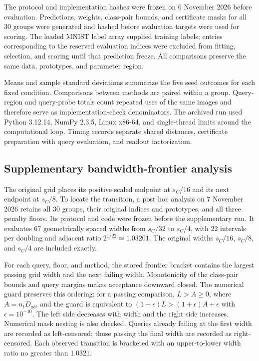 \documentclass[preprint,12pt,authoryear]{elsarticle}
\begin{document}
The protocol and implementation hashes were frozen on 6 November 2026 before evaluation. Predictions, weights, class-pair bounds, and certificate masks for all 30 groups were generated and hashed before evaluation targets were used for scoring. The loaded MNIST label array supplied training labels; entries corresponding to the reserved evaluation indices were excluded from fitting, selection, and scoring until that prediction freeze. All comparisons preserve the same data, prototypes, and parameter region.

Means and sample standard deviations summarize the five seed outcomes for each fixed condition. Comparisons between methods are paired within a group. Query-region and query-probe totals count repeated uses of the same images and therefore serve as implementation-check denominators. The archived run used Python 3.12.14, NumPy 2.3.5, Linux x86-64, and single-thread limits around the computational loop. Timing records separate shared distances, certificate preparation with query evaluation, and readout factorization.

\subsection{Supplementary bandwidth-frontier analysis}
The original grid places its positive scaled endpoint at $s_C/16$ and its next endpoint at $s_C/8$. To locate the transition, a post hoc analysis on 7 November 2026 retains all 30 groups, their original indices and prototypes, and all three penalty floors. Its protocol and code were frozen before the supplementary run. It evaluates 67 geometrically spaced widths from $s_C/32$ to $s_C/4$, with 22 intervals per doubling and adjacent ratio $2^{1/22}\simeq1.03201$. The original widths $s_C/16$, $s_C/8$, and $s_C/4$ are included exactly.

For each query, floor, and method, the stored frontier bracket contains the largest passing grid width and the next failing width. Monotonicity of the class-pair bounds and query margins makes acceptance downward closed. The numerical guard preserves this ordering: for a passing comparison, $L>A\geq0$, where $A=n_tD_{ab}$, and the guard is equivalent to $(1-\epsilon)L>(1+\epsilon)A+\epsilon$ with $\epsilon=10^{-10}$. The left side decreases with width and the right side increases. Numerical mask nesting is also checked. Queries already failing at the first width are recorded as left-censored; those passing the final width are recorded as right-censored. Each observed transition is bracketed with an upper-to-lower width ratio no greater than 1.0321.
\end{document}
